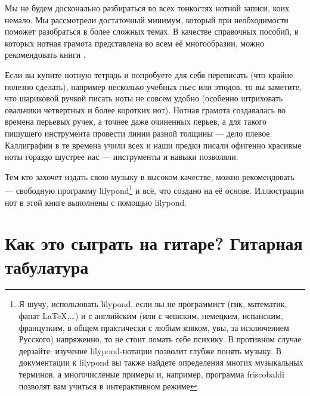 

Мы не будем досконально разбираться во всех тонкостях нотной записи, коих немало. Мы рассмотрели достаточный минимум, который при необходимости поможет разобраться в более сложных темах. В качестве справочных пособий, в которых нотная грамота представлена во всем её многообразии, можно рекомендовать книги \cite{bib:alekseev:MusicTheory,bib:vahromeev:Theory}.

Если вы купите нотную тетрадь и попробуете для себя переписать (что крайне полезно сделать), например несколько учебных пьес или этюдов, то вы заметите, что шариковой ручкой писать ноты не совсем удобно (особенно штриховать овальчики четвертных и более коротких нот). Нотная грамота создавалась во времена перьевых ручек, а точнее даже очиненных перьев, а для такого пишущего инструмента провести линии разной толщины --- дело плевое. Каллиграфии в те времена учили всех и наши предки писали офигенно красивые ноты гораздо шустрее нас --- инструменты и навыки позволяли.

Тем кто захочет издать свою музыку в высоком качестве, можно рекомендовать \cite{url:lilypond} --- свободную программу lilypond\footnote{Я шучу, использовать lilypond, если вы не программист (гик, математик, фанат \LaTeX,\ldots) и с английским (или с чешским, немецким, испанским, французким, в общем практически с любым язвком, увы, за исключением Русского) напряженно, то не стоит ломать себе психику. В противном случае дерзайте: изучение lilypond-нотации позволит глубже понять музыку. В документации к lilypond вы также найдете определения многих музыкальных терминов, а многочисленые примеры и, например, программа friscobaldi позволят вам учиться в интерактивном режиме} и всё, что создано на её основе. Иллюстрации нот в этой книге выполнены с помощью lilypond.


\section{Как это сыграть на гитаре? Гитарная табулатура}



